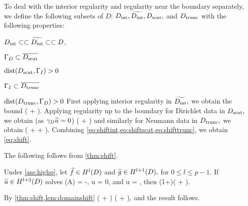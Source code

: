 To deal with the interior regularity and regularity near the boundary separately, we define the following subsets of $D$: $D_{\mathrm{int}},\widetilde{D_{\mathrm{int}}},D_{\mathrm{scat}},$ and $D_{\mathrm{trunc}}$ with the following properties:
\bit
\item $D_{\mathrm{int}} \subset\subset \widetilde{D_{\mathrm{int}}} \subset\subset D$,
\item $\Gamma_{D} \subset \overline{D_{\mathrm{scat}}}$
\item $\operatorname{dist}(D_{\mathrm{scat}},\Gamma_{I}) > 0 $
  \item $\Gamma_{I} \subset \overline{D_{\mathrm{trunc}}}$
\item $\operatorname{dist}(D_{\mathrm{trunc}},\Gamma_{D}) > 0 $
    \eit
    First applying interior regularity \cite[Theorem 4.16]{Mc:00} in $\widetilde{D_{\mathrm{int}}},$ we obtain the bound
    \beq\label{eq:shiftint}
\NHlptDint{\utilde} \leq \CintAl \mleft(\NHoDinttilde{\utilde} + \NHlDinttilde{\ftilde}\mright).
\eeq
Applying regularity up to the boundary for Dirichlet data \cite[Theorem 4.18 (i)]{Mc:00} in $D_{\mathrm{scat}},$ we obtain (as $\gamma_{D} \widetilde{u} = 0$)
\beq\label{eq:shiftscat}
\NHlptDscat{\utilde} \leq \CscatAl \mleft(\NHoD{\utilde} + \NHlD{\ftilde}\mright)
\eeq
and similarly for Neumann data \cite[Theorem 4.18 (ii)]{Mc:00} in $D_{\mathrm{trunc}},$ we obtain
\beq\label{eq:shifttrunc}
\NHlptDtrunc{\utilde} \leq \CtruncAl \mleft(\NHoD{\utilde} + \NHlphGI{\dn \utilde} + \NHlD{\ftilde}\mright).
\eeq
Combining \cref{eq:shiftint,eq:shiftscat,eq:shifttrunc}, we obtain \cref{eq:shift}.
\epf






The following  follows from \cref{thm:shift}.

\bco\label{lem:domainshift}
Under \cref{ass:highp}, let $\ftilde \in \HlD$ and $\gtilde \in \HlpoD,$ for $0 \leq l \leq p-1$. If $\utilde \in \HlptD$ solves
\beqs
\grad \cdot \mleft(A\grad \utilde\mright) = -\ftilde,
\eeqs
\beqs \trGD u = 0,
\eeqs
and
\beqs
\dn u = \gtilde,
\eeqs
then
\beqs
\NHlptD{\utilde} \leq \CAl\mleft(1+\CTrlpo\mright)\mleft(\NHlD{\ftilde} + \NHlpoD{\gtilde}\mright).
\eeqs
\eco

By \cref{thm:shift,lem:domainshift}
\beqs
\NHlptD{\utilde} \leq \CAl \mleft(\NHlD{\ftilde} + \NHlphGI{\gtilde}\mright) \leq \CAl \mleft(\NHlD{\ftilde} + \CTrs\NHlpoD{\gtilde}\mright),
\eeqs
and the result follows.
\epf


